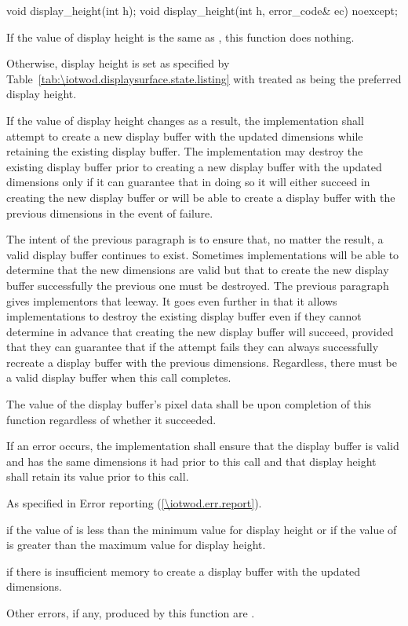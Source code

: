\begin{itemdecl}
void display_height(int h);
void display_height(int h, error_code& ec) noexcept;
\end{itemdecl}
\begin{itemdescr}
\pnum
\effects
If the value of display height is the same as , this function does nothing.

\pnum
Otherwise, display height is set as specified by Table~\ref{tab:\iotwod.displaysurface.state.listing} with  treated as being the preferred display height.

\pnum
If the value of display height changes as a result, the implementation shall attempt to create a new display buffer with the updated dimensions while retaining the existing display buffer. The implementation may destroy the existing display buffer prior to creating a new display buffer with the updated dimensions only if it can guarantee that in doing so it will either succeed in creating the new display buffer or will be able to create a display buffer with the previous dimensions in the event of failure.

\pnum
\begin{note}
The intent of the previous paragraph is to ensure that, no matter the result, a valid display buffer continues to exist. Sometimes implementations will be able to determine that the new dimensions are valid but that to create the new display buffer successfully the previous one must be destroyed. The previous paragraph gives implementors that leeway. It goes even further in that it allows implementations to destroy the existing display buffer even if they cannot determine in advance that creating the new display buffer will succeed, provided that they can guarantee that if the attempt fails they can always successfully recreate a display buffer with the previous dimensions. Regardless, there must be a valid display buffer when this call completes.
\end{note}

\pnum
The value of the display buffer's pixel data shall be \unspecnorm upon completion of this function regardless of whether it succeeded.

\pnum
If an error occurs, the implementation shall ensure that the display buffer is valid and has the same dimensions it had prior to this call and that display height shall retain its value prior to this call.

\pnum
\throws
As specified in Error reporting (\ref{\iotwod.err.report}).

\pnum
\errors
{} if the value of  is less than the minimum value for display height or if the value of  is greater than the maximum value for display height.

 if there is insufficient memory to create a display buffer with the updated dimensions.

Other errors, if any, produced by this function are .
\end{itemdescr}

